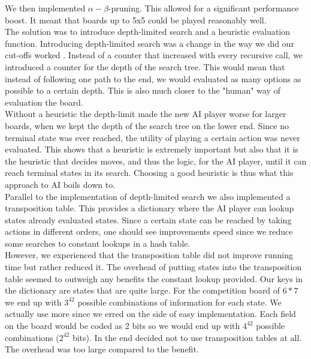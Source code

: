 \documentclass[11pt, a4paper]{article}
\begin{document}
We then implemented $\alpha-\beta$-pruning. This allowed for a significant performance boost. It meant that boards up to 5x5 could be played reasonably well.\\

The solution was to introduce depth-limited search and a heuristic evaluation function. Introducing depth-limited search was a change in the way we did our cut-offs worked . Instead of a counter that increased with every recursive call, we introduced a counter for the depth of the search tree. This would mean that instead of following one path to the end, we would evaluated as many options as possible to a certain depth. This is also much closer to the "human" way of evaluation the board.\\

Without a heuristic the depth-limit made the new AI player worse for larger boards, when we kept the depth of the search tree on the lower end. Since no terminal state was ever reached, the utility of playing a certain action was never evaluated. This shows that a heuristic is extremely important but also that it is the heuristic that decides moves, and thus the logic, for the AI player, until it can reach terminal states in its search. Choosing a good heuristic is
thus what this approach to AI boils down to.\\

Parallel to the implementation of depth-limited search we also implemented a transposition table. This provides a dictionary where the AI player can lookup
states already evaluated states. Since a certain state can be reached by taking actions in different orders, one should see improvements speed since we
reduce some searches to constant lookups in a hash table.\\

However, we experienced that the transposition table did not improve running time but rather reduced it. The overhead of putting states into the
transposition table seemed to outweigh any benefits the constant lookup provided. Our keys in the dictionary are states that are quite large. For the
competition board of $6*7$ we end up with $3^{42}$ possible combinations of information for each state. We actually use more since we erred on the side
of easy implementation. Each field on the board would be coded as 2 bits so we would end up with $4^{42}$ possible combinations ($2^{42}$ bits). In the end decided not to use transposition tables at all. The overhead was too large compared to the benefit.
\end{document}
